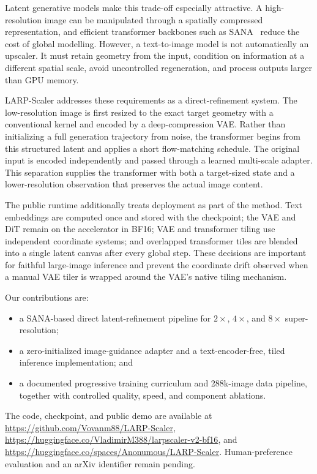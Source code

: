 \documentclass[10pt]{article}
\newcommand{\method}{LARP-Scaler\xspace}
\begin{document}
Latent generative models make this trade-off especially attractive. A
high-resolution image can be manipulated through a spatially compressed
representation, and efficient transformer backbones such as
SANA~\cite{xie2025sana} reduce the cost of global modelling. However, a
text-to-image model is not automatically an upscaler. It must retain geometry
from the input, condition on information at a different spatial scale, avoid
uncontrolled regeneration, and process outputs larger than GPU memory.

\method addresses these requirements as a direct-refinement system. The
low-resolution image is first resized to the exact target geometry with a
conventional kernel and encoded by a deep-compression VAE. Rather than
initializing a full generation trajectory from noise, the transformer begins
from this structured latent and applies a short flow-matching schedule. The
original input is encoded independently and passed through a learned
multi-scale adapter. This separation supplies the transformer with both a
target-sized state and a lower-resolution observation that preserves the
actual image content.

The public runtime additionally treats deployment as part of the method. Text
embeddings are computed once and stored with the checkpoint; the VAE and DiT
remain on the accelerator in BF16; VAE and transformer tiling use independent
coordinate systems; and overlapped transformer tiles are blended into a
single latent canvas after every global step. These decisions are important
for faithful large-image inference and prevent the coordinate drift observed
when a manual VAE tiler is wrapped around the VAE's native tiling mechanism.

Our contributions are:
\begin{itemize}
  \item a SANA-based direct latent-refinement pipeline for $2\times$,
  $4\times$, and $8\times$ super-resolution;
  \item a zero-initialized image-guidance adapter and a text-encoder-free,
  tiled inference implementation; and
  \item a documented progressive training curriculum and 288k-image data
  pipeline, together with controlled quality, speed, and component ablations.
\end{itemize}

The code, checkpoint, and public demo are available at
\url{https://github.com/Vovanm88/LARP-Scaler},
\url{https://huggingface.co/VladimirM388/larpscaler-v2-bf16}, and
\url{https://huggingface.co/spaces/Anonumous/LARP-Scaler}. Human-preference
evaluation and an arXiv identifier remain pending.
\end{document}
